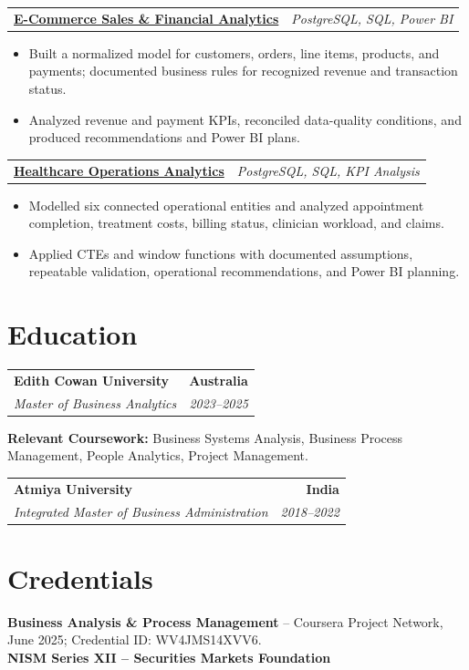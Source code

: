 \documentclass[letterpaper,10pt]{article}
\makeatletter
\newcommand{\role}[4]{%
  \begin{tabularx}{\textwidth}{@{}Xr@{}}
    \textbf{#1} & \textbf{#2} \\
    \textit{#3} & \textit{#4}
  \end{tabularx}\vspace{-1pt}
}
\newcommand{\project}[2]{%
  \begin{tabularx}{\textwidth}{@{}Xr@{}}
    \textbf{#1} & \textit{#2}
  \end{tabularx}\vspace{-1pt}
}
\makeatother
\begin{document}
\project{\href{https://github.com/jainalimehta/Ecommerce-Sales-Analytics}{E-Commerce Sales \& Financial Analytics}}{PostgreSQL, SQL, Power BI}
\begin{itemize}
  \item Built a normalized model for customers, orders, line items, products, and payments; documented business rules for recognized revenue and transaction status.
  \item Analyzed revenue and payment KPIs, reconciled data-quality conditions, and produced recommendations and Power BI plans.
\end{itemize}
\vspace{1pt}

\project{\href{https://github.com/jainalimehta/Healthcare-Analytics}{Healthcare Operations Analytics}}{PostgreSQL, SQL, KPI Analysis}
\begin{itemize}
  \item Modelled six connected operational entities and analyzed appointment completion, treatment costs, billing status, clinician workload, and claims.
  \item Applied CTEs and window functions with documented assumptions, repeatable validation, operational recommendations, and Power BI planning.
\end{itemize}

\section{Education}
\role{Edith Cowan University}{Australia}{Master of Business Analytics}{2023--2025}
\small\textbf{Relevant Coursework:} Business Systems Analysis, Business Process Management, People Analytics, Project Management.\\[2pt]
\role{Atmiya University}{India}{Integrated Master of Business Administration}{2018--2022}

\section{Credentials}
\small\textbf{Business Analysis \& Process Management} -- Coursera Project Network, June 2025; Credential ID: WV4JMS14XVV6.\\[-0.2pt]
\small\textbf{NISM Series XII -- Securities Markets Foundation}
\end{document}
